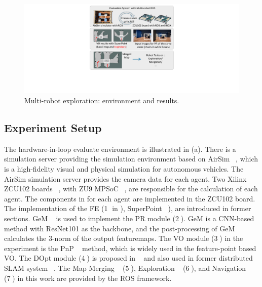 \label{sec:experiments}


\begin{figure}[t]
  \centering
  \includegraphics[width=0.8\linewidth]{fig/env.pdf}
  \caption{Multi-robot exploration: environment and results. }
  \label{fig:env}
\end{figure}





\subsection{ Experiment Setup }

The hardware-in-loop evaluate environment is illustrated in (a). There is a simulation server providing the simulation environment based on AirSim  ~\cite{shah2018airsim}, which is a high-fidelity visual and physical simulation for autonomous vehicles. The AirSim simulation server provides the camera data for each agent. Two Xilinx ZCU102 boards  ~\cite{zcu102}, with ZU9 MPSoC  ~\cite{MPSoC}, are responsible for the calculation of each agent. 
The components in  for each agent are implemented in the ZCU102 board. The implementation of the FE (\textcircled{1} in ), SuperPoint ~\cite{detone2018superpoint}), are introduced in former sections. GeM  ~\cite{radenovic2018fine} is used to implement the PR module (\textcircled{2}). GeM is a CNN-based method with ResNet101 \cite{he2016deep} as the backbone, and the post-processing of GeM calculates the 3-norm of the output featuremaps.
The VO module (\textcircled{3}) in the experiment is the PnP  ~\cite{LepetitMoreno-Noguer-EPnP} method, which is widely used in the feature-point based VO. 
The DOpt module (\textcircled{4}) is proposed in  ~\cite{Choudhary:2017e66} and also used in former distributed SLAM system ~\cite{cieslewski2018data}. 
The Map Merging  ~\cite{Andre2014} (\textcircled{5}), Exploration  ~\cite{8202319} (\textcircled{6}), and Navigation  ~\cite{tbd} (\textcircled{7}) in this work are provided by the ROS framework. 


